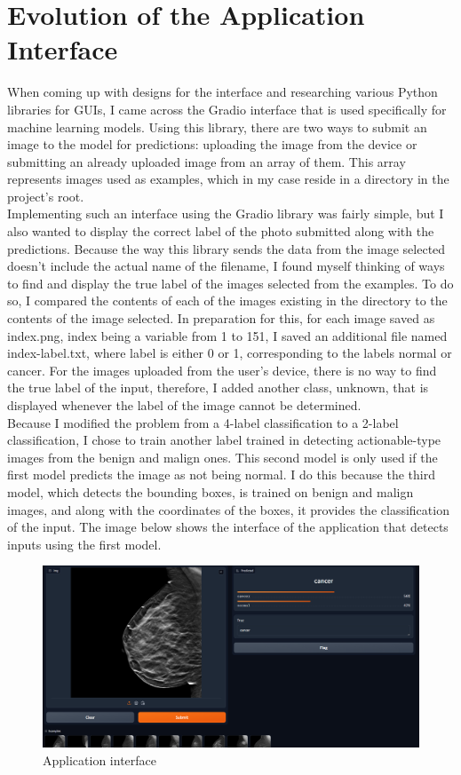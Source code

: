 \chapter{Evolution of the Application Interface}
When coming up with designs for the interface and researching various Python libraries for GUIs, I came across the Gradio interface that is used specifically for machine learning models. Using this library, there are two ways to submit an image to the model for predictions: uploading the image from the device or submitting an already uploaded image from an array of them. This array represents images used as examples, which in my case reside in a directory in the project's root. \\
Implementing such an interface using the Gradio library was fairly simple, but I also wanted to display the correct label of the photo submitted along with the predictions. Because the way this library sends the data from the image selected doesn't include the actual name of the filename, I found myself thinking of ways to find and display the true label of the images selected from the examples. To do so, I compared the contents of each of the images existing in the directory to the contents of the image selected. In preparation for this, for each image saved as index.png, index being a variable from 1 to 151, I saved an additional file named index-label.txt, where label is either 0 or 1, corresponding to the labels normal or cancer. For the images uploaded from the user's device, there is no way to find the true label of the input, therefore, I added another class, unknown, that is displayed whenever the label of the image cannot be determined.\\
Because I modified the problem from a 4-label classification to a 2-label classification, I chose to train another label trained in detecting actionable-type images from the benign and malign ones. This second model is only used if the first model predicts the image as not being normal. I do this because the third model, which detects the bounding boxes, is trained on benign and malign images, and along with the coordinates of the boxes, it provides the classification of the input. The image below shows the interface of the application that detects inputs using the first model.\\
\begin{figure}[ht!]
    \centering
    \includegraphics[width=0.75\linewidth]{figures/Figure16.png}
    \caption{Application interface}
    \label{fig:fig15}
\end{figure}